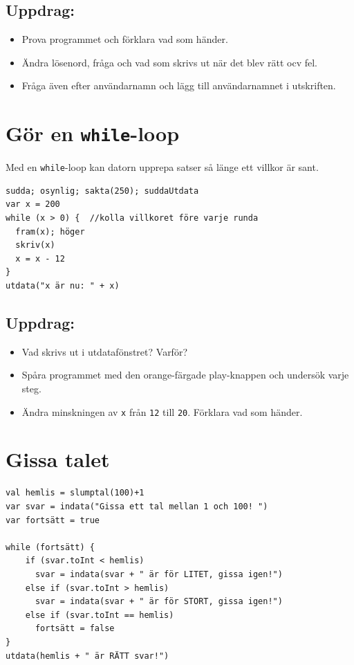 \section*{\color{BrickRed}Uppdrag:}


\begin{itemize}

\item {Prova programmet och förklara vad som händer.}
\item {Ändra lösenord, fråga och vad som skrivs ut när det blev rätt ocv fel.}
\item {Fråga även efter användarnamn och lägg till användarnamnet i utskriften.}

\end{itemize}


\chapter{Gör en \lstinline{while}-loop}Med en \lstinline{while}-loop kan datorn upprepa satser så länge ett villkor är sant.

\begin{lstlisting}[basicstyle={\ttfamily\fontsize{22}{27}\selectfont},numbers=none]
sudda; osynlig; sakta(250); suddaUtdata
var x = 200
while (x > 0) {  //kolla villkoret före varje runda 
  fram(x); höger
  skriv(x) 
  x = x - 12
}
utdata("x är nu: " + x)
\end{lstlisting}
        
\section*{\color{BrickRed}Uppdrag:}


\begin{itemize}

\item {Vad skrivs ut i utdatafönstret? Varför?}
\item {Spåra programmet med den orange-färgade play-knappen och undersök varje steg.}
\item {Ändra minskningen av \lstinline{x} från \lstinline{12} till \lstinline{20}. Förklara vad som händer.}

\end{itemize}


\chapter{Gissa talet}
\begin{lstlisting}[basicstyle={\ttfamily\fontsize{16}{19}\selectfont},numbers=none]
val hemlis = slumptal(100)+1
var svar = indata("Gissa ett tal mellan 1 och 100! ")
var fortsätt = true

while (fortsätt) {
    if (svar.toInt < hemlis)
      svar = indata(svar + " är för LITET, gissa igen!")
    else if (svar.toInt > hemlis)
      svar = indata(svar + " är för STORT, gissa igen!")
    else if (svar.toInt == hemlis)
      fortsätt = false
}
utdata(hemlis + " är RÄTT svar!")
\end{lstlisting}
        
